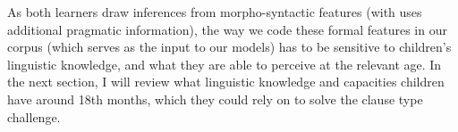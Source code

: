 






As both learners draw inferences from morpho-syntactic features (with \plearnerabbr{} uses additional pragmatic information), the way we code these formal features in our corpus (which serves as the input to our models) has to be sensitive to children's linguistic knowledge, and what they are able to perceive at the relevant age. In the next section, I will review what linguistic knowledge and capacities children have around 18th months, which they could rely on to solve the clause type challenge. %



